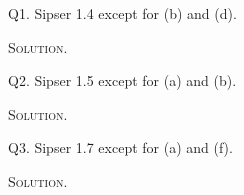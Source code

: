 \newpage
Q1. Sipser 1.4 except for (b) and (d).

\textsc{Solution}.





\newpage
Q2. Sipser 1.5 except for (a) and (b).

\textsc{Solution}.




\newpage
Q3. Sipser 1.7 except for (a) and (f).

\textsc{Solution}.




